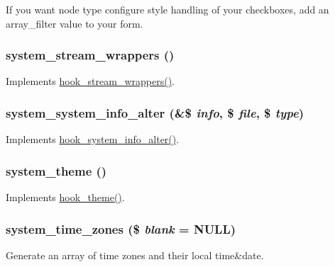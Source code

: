 If you want node type configure style handling of your checkboxes, add an array\_\-filter value to your form. \hypertarget{system_8module_a67821dedc3699910bb2168a40c5d7278}{
\subsubsection[{system\_\-stream\_\-wrappers}]{\setlength{\rightskip}{0pt plus 5cm}system\_\-stream\_\-wrappers ()}}
\label{system_8module_a67821dedc3699910bb2168a40c5d7278}
Implements \hyperlink{group__hooks_ga6fadcf625a4766e7f0d97b1628b294dc}{hook\_\-stream\_\-wrappers()}. \hypertarget{system_8module_afbaff10d8aad0b8916039e458292218c}{
\subsubsection[{system\_\-system\_\-info\_\-alter}]{\setlength{\rightskip}{0pt plus 5cm}system\_\-system\_\-info\_\-alter (\&\$ {\em info}, \/  \$ {\em file}, \/  \$ {\em type})}}
\label{system_8module_afbaff10d8aad0b8916039e458292218c}
Implements \hyperlink{group__hooks_ga7dd7f887131916d5bbbb02ae87a9113e}{hook\_\-system\_\-info\_\-alter()}. \hypertarget{system_8module_a44b4dbe61c9f2fb668b8b2003dd00090}{
\subsubsection[{system\_\-theme}]{\setlength{\rightskip}{0pt plus 5cm}system\_\-theme ()}}
\label{system_8module_a44b4dbe61c9f2fb668b8b2003dd00090}
Implements \hyperlink{group__hooks_ga013ccb45c7aaab1c16cf9691428c910d}{hook\_\-theme()}. \hypertarget{system_8module_af21d6c134a3a6c6114def38efc153201}{
\subsubsection[{system\_\-time\_\-zones}]{\setlength{\rightskip}{0pt plus 5cm}system\_\-time\_\-zones (\$ {\em blank} = {\ttfamily NULL})}}
\label{system_8module_af21d6c134a3a6c6114def38efc153201}
Generate an array of time zones and their local time\&date.


